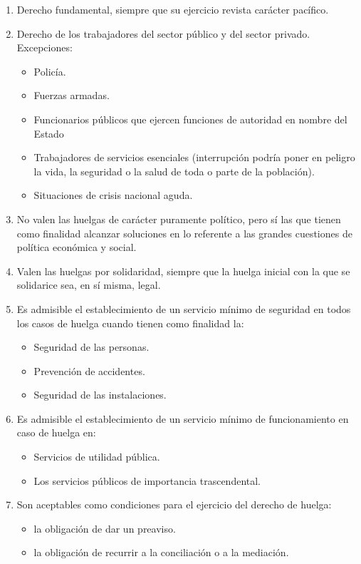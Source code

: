 \documentclass[spanish,12pt,a4paper,titlepage]{report}
\begin{document}
\begin{enumerate}
\item Derecho fundamental, siempre que su ejercicio revista carácter pacífico.
\item Derecho de los trabajadores del sector público y del sector privado.
  Excepciones:
  \begin{itemize}
  \item Policía.
  \item Fuerzas armadas.
  \item Funcionarios públicos que ejercen funciones de autoridad en nombre del Estado
  \item Trabajadores de servicios esenciales (interrupción podría poner en peligro la vida, la seguridad o la salud de toda o parte de la población).
  \item Situaciones de crisis nacional aguda.
  \end{itemize}
\item No valen las huelgas de carácter puramente político, pero sí las que tienen como finalidad alcanzar soluciones en lo referente a las grandes cuestiones de política económica y social.
\item Valen las huelgas por solidaridad, siempre que la huelga inicial con la que se solidarice sea, en sí misma, legal.
\item Es admisible el establecimiento de un servicio mínimo de seguridad en todos los casos de huelga cuando tienen como finalidad la:
  \begin{itemize}
  \item Seguridad de las personas.
  \item Prevención de accidentes.
  \item Seguridad de las instalaciones.
  \end{itemize}
\item Es admisible el establecimiento de un servicio mínimo de funcionamiento en caso de huelga en:
  \begin{itemize}
  \item Servicios de utilidad pública.
  \item Los servicios públicos de importancia trascendental.
  \end{itemize}
\item Son aceptables como condiciones para el ejercicio del derecho de huelga:
  \begin{itemize}
  \item la obligación de dar un preaviso.
  \item la obligación de recurrir a la conciliación o a la mediación.

\end{itemize}
\end{enumerate}
\end{document}
